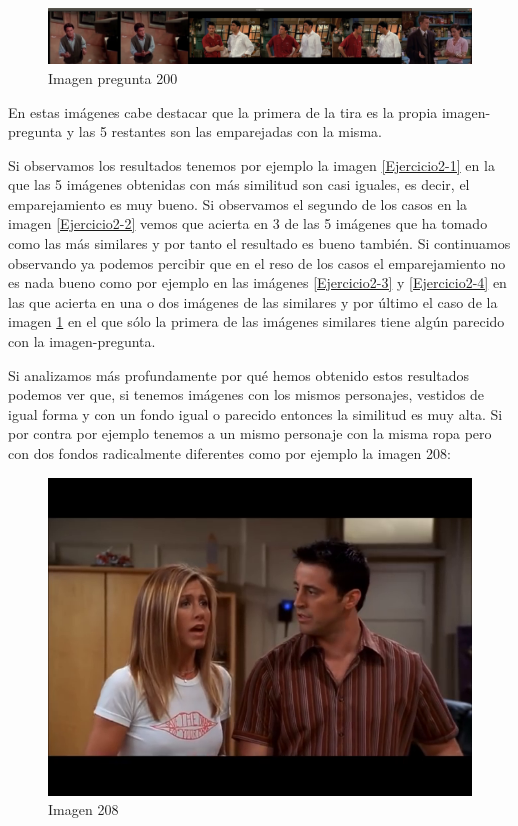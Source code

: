 \documentclass[12pt,a4paper]{article}
\begin{document}
\begin{figure}[H]
  \centering
  \includegraphics[scale=0.135]{./Imagenes/Ejercicio2-5.png}
  \caption{Imagen pregunta 200}
	\label{Ejercicio2-5}
\end{figure}

En estas imágenes cabe destacar que la primera de la tira es la propia imagen-pregunta y las 5 restantes son las emparejadas con la misma.

\vspace{10px}

Si observamos los resultados tenemos por ejemplo la imagen \ref{Ejercicio2-1} en la que las 5 imágenes obtenidas con más similitud son casi iguales, es decir, el emparejamiento es muy bueno. Si observamos el segundo de los casos en la imagen \ref{Ejercicio2-2} vemos que acierta en 3 de las 5 imágenes que ha tomado como las más similares y por tanto el resultado es bueno también. Si continuamos observando ya podemos percibir que en el reso de los casos el emparejamiento no es nada bueno como por ejemplo en las imágenes \ref{Ejercicio2-3} y \ref{Ejercicio2-4} en las que acierta en una o dos imágenes de las similares y por último el caso de la imagen \ref{Ejercicio2-5} en el que sólo la primera de las imágenes similares tiene algún parecido con la imagen-pregunta.

\vspace{10px}

Si analizamos más profundamente por qué hemos obtenido estos resultados podemos ver que, si tenemos imágenes con los mismos personajes, vestidos de igual forma y con un fondo igual o parecido entonces la similitud es muy alta. Si por contra por ejemplo tenemos a un mismo personaje con la misma ropa pero con dos fondos radicalmente diferentes como por ejemplo la imagen 208:

\begin{figure}[H]
  \centering
  \includegraphics[scale=0.35]{./Imagenes/208.png}
  \caption{Imagen 208}
	\label{208}
\end{figure}
\end{document}
